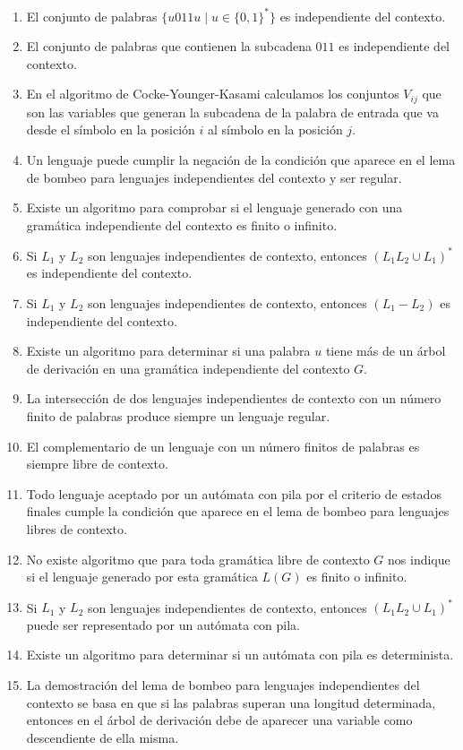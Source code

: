 \begin{enumerate}
    \item El conjunto de palabras $\{u011u\mid u\in {\{0,1\}}^{\ast}\}$ es independiente del contexto.
    \item El conjunto de palabras que contienen la subcadena $011$ es independiente del contexto.
    \item En el algoritmo de Cocke-Younger-Kasami calculamos los conjuntos $V_{ij}$ que son las variables que generan la subcadena de la palabra de entrada que va desde el símbolo en la posición $i$ al símbolo en la posición $j$.
    \item Un lenguaje puede cumplir la negación de la condición que aparece en el lema de bombeo para lenguajes independientes del contexto y ser regular.
    \item Existe un algoritmo para comprobar si el lenguaje generado con una gramática independiente del contexto es finito o infinito.
    \item Si $L_1$ y $L_2$ son lenguajes independientes de contexto, entonces ${(L_1L_2 \cup L_1)}^{\ast}$ es independiente del contexto.
    \item Si $L_1$ y $L_2$ son lenguajes independientes de contexto, entonces $(L_1-L_2)$ es independiente del contexto.
    \item Existe un algoritmo para determinar si una palabra $u$ tiene más de un árbol de derivación en una gramática independiente del contexto $G$.
    \item La intersección de dos lenguajes independientes de contexto con un número finito de palabras produce siempre un lenguaje regular.
    \item El complementario de un lenguaje con un número finitos de palabras es siempre libre de contexto.
    \item Todo lenguaje aceptado por un autómata con pila por el criterio de estados finales cumple la condición que aparece en el lema de bombeo para lenguajes libres de contexto.
    \item No existe algoritmo que para toda gramática libre de contexto $G$ nos indique si el lenguaje generado por esta gramática $L(G)$ es finito o infinito.
    \item Si $L_1$ y $L_2$ son lenguajes independientes de contexto, entonces ${(L_1L_2\cup L_1)}^{\ast}$ puede ser representado por un autómata con pila.
    \item Existe un algoritmo para determinar si un autómata con pila es determinista.
    \item La demostración del lema de bombeo para lenguajes independientes del contexto se basa en que si las palabras superan una longitud determinada, entonces en el árbol de derivación debe de aparecer una variable como descendiente de ella misma.

\end{enumerate}
